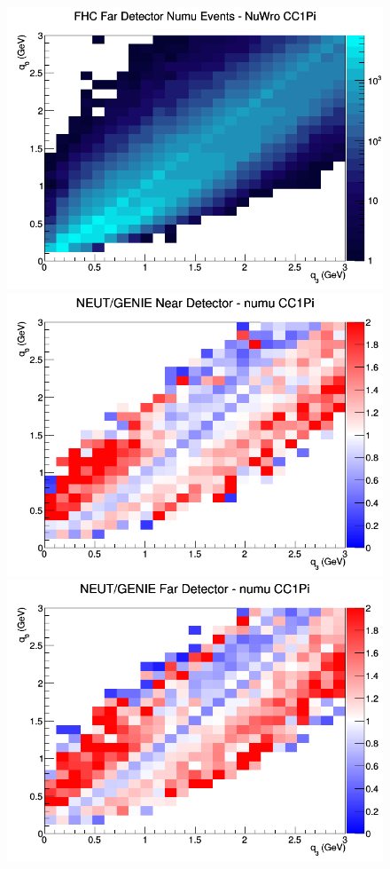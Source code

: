 \documentclass[12pt]{article}
\begin{document}
\begin{figure}[h]
\endminipage
{}
\includegraphics[width=\linewidth]{eff_q0_q3/GAr/CC1Pi_FHC_FD_numu_q3_q0_NuWro.png}
\endminipage
\newline
{}
\includegraphics[width=\linewidth]{eff_q0_q3/GAr/ratios/CC1Pi_NEUT_GENIE_numu_near_q3_q0.png}
\endminipage
{}
\includegraphics[width=\linewidth]{eff_q0_q3/GAr/ratios/CC1Pi_NEUT_GENIE_numu_far_q3_q0.png}

\end{figure}
\end{document}
